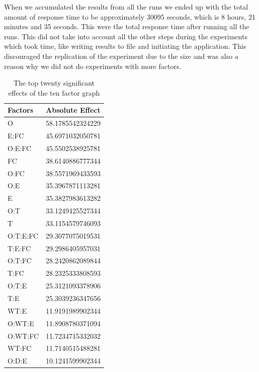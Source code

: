 \documentclass{llncs}
\begin{document}
When we accumulated the results from all the runs we ended up with the
total amount of response time to be approximately 30095 seconds, which
is 8 hours, 21 minutes and 35 seconds.  This were the total response
time after running all the runs. This did not take into account all
the other steps during the experiments which took time, like writing
results to file and initiating the application.  This discouraged the
replication of the experiment due to the size and was also a reason
why we did not do experiments with more factors.




\begin{table}
\begin{center}
    \begin{tabular}{ | l l |}
    \hline
    {\bf Factors} & {\bf Absolute Effect}  \\ \hline
      O & 58.1785542324229 \\ \hline
      E:FC & 45.6971032050781 \\ \hline
      O:E:FC & 45.5502538925781\\ \hline
      FC & 38.6140886777344\\ \hline
      O:FC & 38.5571969433593\\ \hline
      O:E & 35.3967871113281\\ \hline
      E & 35.3827983613282\\ \hline
      O:T & 33.1249425527344\\ \hline
      T & 33.1154579746093\\ \hline
      O:T:E:FC & 29.3077075019531\\ \hline
      T:E:FC & 29.2986405957031\\ \hline
      O:T:FC & 28.2420862089844\\ \hline
      T:FC & 28.2325333808593\\ \hline
      O:T:E & 25.3121093378906\\ \hline
      T:E & 25.3039236347656\\ \hline
      WT:E & 11.9191989902344\\ \hline
      O:WT:E & 11.8908780371094\\ \hline
      O:WT:FC & 11.7234715332032\\ \hline
      WT:FC & 11.7140515488281\\ \hline
      O:D:E & 10.1241599902344\\ \hline
    \end{tabular}
\end{center}
\caption{The top twenty significant effects of the ten factor graph}\label{10factorEffect}
\end{table}
\end{document}
